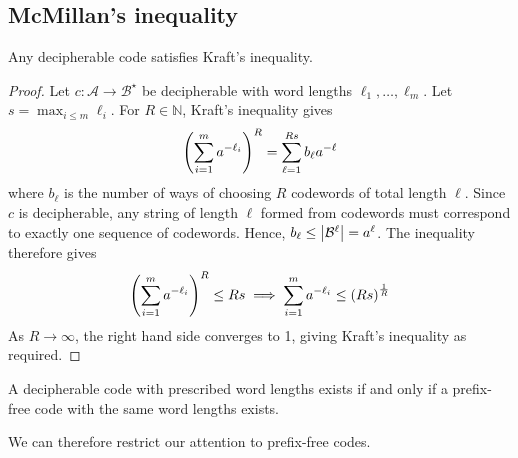\subsection{McMillan's inequality}
\begin{theorem}
    Any decipherable code satisfies Kraft's inequality.
\end{theorem}
\begin{proof}
    Let \( c \colon \mathcal A \to \mathcal B^\star \) be decipherable with word lengths \( \ell_1, \dots, \ell_m \).
    Let \( s = \max_{i \leq m} \ell_i \).
    For \( R \in \mathbb N \), Kraft's inequality gives
    \[ \qty(\sum_{i=1}^m a^{-\ell_i})^R = \sum_{\ell = 1}^{Rs} b_\ell a^{-\ell} \]
    where \( b_\ell \) is the number of ways of choosing \( R \) codewords of total length \( \ell \).
    Since \( c \) is decipherable, any string of length \( \ell \) formed from codewords must correspond to exactly one sequence of codewords.
    Hence, \( b_\ell \leq \abs{\mathcal B^\ell} = a^\ell \).
    The inequality therefore gives
    \[ \qty(\sum_{i=1}^m a^{-\ell_i})^R \leq Rs \implies \sum_{i=1}^m a^{-\ell_i} \leq \qty(Rs)^{\frac{1}{R}} \]
    As \( R \to \infty \), the right hand side converges to 1, giving Kraft's inequality as required.
\end{proof}
\begin{corollary}
    A decipherable code with prescribed word lengths exists if and only if a prefix-free code with the same word lengths exists.
\end{corollary}
We can therefore restrict our attention to prefix-free codes.

